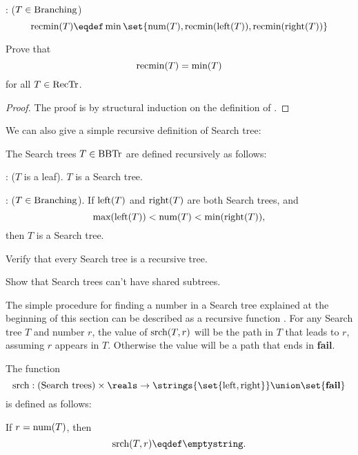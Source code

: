 \begin{definition}
\begin{problem}
: ($T \in \text{Branching}$)
\[
\rmin{(T)} \eqdef \min\set{\nlbl{(T)}, \rmin{(\leftsub{(T)})}, \rmin{(\rightsub{(T)})}}
\]

Prove that
\[
\text{recmin}(T) = \text{min}(T)
\]
for all $T \in \text{RecTr}$.
\begin{solution}

\begin{proof}
The proof is by structural induction on the definition of \rmin{}.
\end{proof}

\end{solution}

\end{problem}

We can also give a simple recursive definition of Search tree:
\begin{definition}
The Search trees $T \in \text{BBTr}$ are defined recursively as follows:

: ($T$ is a leaf).  $T$ is a Search tree.

: ($T \in \text{Branching}$).
If $\text{left}(T)$ and $\text{right}(T)$ are both Search trees, and
\[
\text{max}(\text{left}(T)) < \text{num}(T) < \text{min}(\text{right}(T)),
\]
then $T$ is a Search tree.
\end{definition}

\begin{problem}
Verify that every Search tree is a recursive tree.

\hint Show that Search trees can't have shared subtrees.

\begin{solution}
\TBA{}
\end{solution}
\end{problem}

The simple procedure for finding a number in a Search tree explained
at the beginning of this section can be described as a recursive
function \trsrch{}.  For any Search tree $T$ and number $r$, the value
of $\text{srch}(T,r)$ will be the path in $T$ that leads to $r$,
assuming $r$ appears in $T$.  Otherwise the value will be a path that
ends in \textbf{fail}.

\begin{definition}
The function
\[
\trsrch{}: \text{(Search trees)} \times \reals \to
\strings{\set{\leftsub{},\rightsub{}}} \union \set{\textbf{fail}}
\]
is defined as follows:

If $r = \text{num}(T)$, then
\[
\trsrch{(T,r)} \eqdef \emptystring.
\]


\end{definition}
\end{definition}
